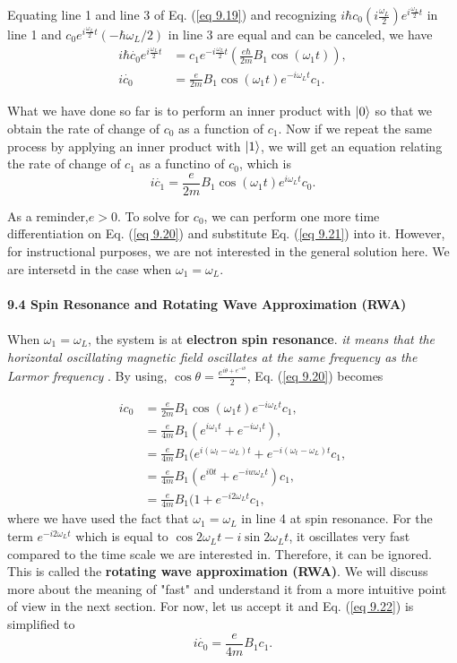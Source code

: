 \documentclass{article}
\begin{document}
Equating line 1 and line 3 of Eq. (\ref{eq 9.19}) and recognizing $i\hbar c_0(i\frac{\omega_L}{2})e^{i\frac{\omega_L}{2}t}$ in line 1
and $c_0e^{i\frac{\omega_L}{2}t}(-\hbar\omega_L/2)$ in line 3 are equal and can be canceled, we have
\begin{align*}\label{eq 9.20}
    i\hbar\dot{c_0}e^{i\frac{\omega_L}{2}t}&=c_1e^{-i\frac{\omega_L}{2}t}(\frac{e\hbar}{2m}B_1\cos(\omega_1t)),\\
    i\dot{c_0}&=\frac{e}{2m}B_1\cos(\omega_1t)e^{-i\omega_Lt}c_1.\tag{9.20}
\end{align*}

What we have done so far is to perform an inner product with $\ket{0}$ so that we obtain
the rate of change of $c_0$ as a function of $c_1$. Now if we repeat the same process by applying an inner 
product with $\ket{1}$, we will get an equation relating the rate of change
of $c_1$ as a functino of $c_0$, which is 
\begin{equation}\label{eq 9.21}
    i\dot{c_1}=\frac{e}{2m}B_1\cos(\omega_1t)e^{i\omega_Lt}c_0.\tag{9.21}
\end{equation}

As a reminder,$e>0$. To solve for $c_0$, we can perform one more time differentiation
on Eq. (\ref{eq 9.20}) and substitute Eq. (\ref{eq 9.21}) into it. However, for instructional
purposes, we are not interested in the general solution here. We are intersetd in the case when
$\omega_1=\omega_L$.\\\\
\textbf{\large 9.4 Spin Resonance and Rotating Wave Approximation (RWA)}\\\\
When $\omega_1=\omega_L$, the system is at \textbf{electron spin resonance}. \textit{
    it means that the horizontal oscillating magnetic field oscillates at the same frequency
    as the Larmor frequency
}. By using, $\cos\theta=\frac{e^{i\theta+e^{-i\theta}}}{2}$, Eq. (\ref{eq 9.20}) becomes

\begin{align*} \label{eq 9.22}
    ic_0&=\frac{e}{2m}B_1\cos(\omega_1t)e^{-i\omega_Lt}c_1,\\
    &=\frac{e}{4m}B_1(e^{i\omega_1t}+e^{-i\omega_1t}),\\
    &=\frac{e}{4m}B_1(e^{i(\omega_t-\omega_L)t}+e^{-i(\omega_t-\omega_L)t}c_1,\\
    &=\frac{e}{4m}B_1(e^{i0t}+e^{-iw\omega_Lt})c_1,\\
    &=\frac{e}{4m}B_1(1+e^{-i2\omega_Lt}c_1, \tag{9.22}
\end{align*}
where we have used the fact that $\omega_1=\omega_L$ in line 4 at spin resonance. For the term $e^{-i2\omega_Lt}$ which
is equal to $\cos2\omega_Lt-i\sin2\omega_Lt$, it oscillates very fast compared to the time scale we are interested in. 
Therefore, it can be ignored. This is called the \textbf{rotating wave approximation (RWA)}. We will discuss more about the 
meaning of "fast" and understand it from a more intuitive point of view in the next section. For now, let us accept it and Eq. 
(\ref{eq 9.22}) is simplified to
\begin{equation}\label{eq 9.23}
    i\dot{c_0}=\frac{e}{4m}B_1c_1.\tag{9.23}
\end{equation}
\end{document}
